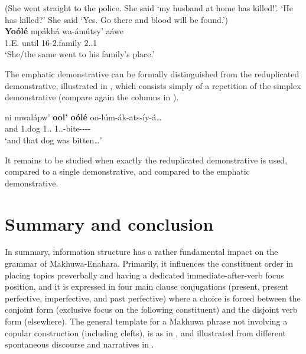 \documentclass[output=paper]{langscibook}
\begin{document}
\z

\ea
\label{bkm:Ref96847549}
(She went straight to the police. She said ‘my husband at home has killed!’. ‘He has killed?’ She said ‘Yes. Go there and blood will be found.’)\\
\gll
\textbf{Yoólé}  mpákhá  wa-ámútsy’  aáwe\\
1.E\DEM{}.\DIST{}  until  16-2.family  2.\POSS{}.1\\
\glt
‘She/the same went to his family’s place.’ \citep[48]{vanderWal2009a}\\

\z

The emphatic demonstrative can be formally distinguished from the reduplicated demonstrative, illustrated in , which consists simply of a repetition of the simplex demonstrative (compare again the columns in ).

\ea
\label{bkm:Ref96847566}
\gll
ni  mwalápw’  \textbf{ool’}  \textbf{oólé}  oo-lúm-ák-ats-íy{}-á…\\
and  1.dog  1.\DEM{}.\DIST{}  \RED{}  1\SM{}.\PFV{}.\DJ{}-bite-\DUR{}-\PLUR-\PASS-\FV{}\\
\glt
‘and that dog was bitten…’ \citep[48]{vanderWal2009a}\\

\z

It remains to be studied when exactly the reduplicated demonstrative is used, compared to a single demonstrative, and compared to the emphatic demonstrative.

\section{Summary and conclusion}

In summary, information structure has a rather fundamental impact on the grammar of Makhuwa-Enahara. Primarily, it influences the constituent order in placing topics preverbally and having a dedicated immediate-after-verb focus position, and it is expressed in four main clause conjugations (present, present perfective, imperfective, and past perfective) where a choice is forced between the conjoint form (exclusive focus on the following constituent) and the disjoint verb form (elsewhere). The general template for a Makhuwa phrase not involving a copular construction (including clefts), is as in , and illustrated from different spontaneous discourse and narratives in .
\end{document}
